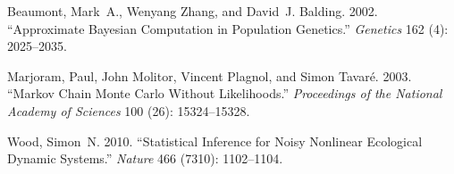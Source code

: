 \documentclass[11pt]{article}
\begin{document}
\begin{thebibliography}{}

Beaumont, Mark~A., Wenyang Zhang, and David~J. Balding. 2002.
``Approximate Bayesian Computation in Population Genetics.''
\emph{Genetics} 162 (4): 2025--2035.

Marjoram, Paul, John Molitor, Vincent Plagnol, and Simon Tavar\'e. 2003.
``Markov Chain Monte Carlo Without Likelihoods.''
\emph{Proceedings of the National Academy of Sciences} 100 (26): 15324--15328.

Wood, Simon~N. 2010.
``Statistical Inference for Noisy Nonlinear Ecological Dynamic Systems.''
\emph{Nature} 466 (7310): 1102--1104.

\end{thebibliography}
\end{document}
